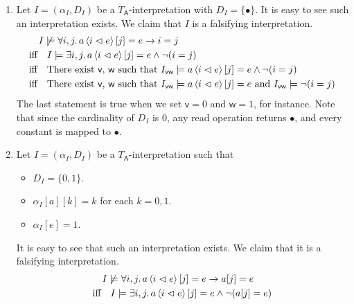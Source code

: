 \begin{exer}[3.4]
    $ $
    \begin{enumerate}[label=(\alph*)]
        \item
            Let $I = (\alpha_I, D_I)$ be a $T_{\textsf{A}}$-interpretation with $D_I = \{ \bullet \}$.
            It is easy to see such an interpretation exists.
            We claim that $I$ is a falsifying interpretation.
            \begin{align*}
                &\quad I \not\models \forall i, j.\, a\ev{i \vartriangleleft e}[j] = e \rightarrow i = j \\
                &\text{iff}\quad I \models \exists i, j.\, a\ev{i \vartriangleleft e}[j] = e \land \neg(i = j) \\
                &\text{iff}\quad \text{There exist \textsf{v}, \textsf{w} such that } I_{\textsf{vw}} \models a\ev{i \vartriangleleft e}[j] = e \land \neg(i = j) \\
                &\text{iff}\quad \text{There exist \textsf{v}, \textsf{w} such that } I_{\textsf{vw}} \models a\ev{i \vartriangleleft e}[j] = e \text{ and } I_{\textsf{vw}} \models \neg(i = j) \\
            \end{align*}
            The last statement is true when we set $\textsf{v} = 0$ and $\textsf{w} = 1$, for instance.
            Note that since the cardinality of $D_I$ is 0, any \textsf{read} operation returns $\bullet$, and every constant is mapped to $\bullet$.
        \item
            Let $I = (\alpha_I, D_I)$ be a $T_{\textsf{A}}$-interpretation such that
            \begin{itemize}
                \item
                    $D_I = \{ 0, 1 \}$.
                \item
                    $\alpha_I[a][k] = k$ for each $k = 0, 1$.
                \item
                    $\alpha_I[e] = 1$.
            \end{itemize}
            It is easy to see that such an interpretation exists.
            We claim that it is a falsifying interpretation.
            \begin{align*}
                &\quad I \not\models \forall i, j.\, a\ev{i \vartriangleleft e}[j] = e \rightarrow a[j] = e \\
                &\text{iff}\quad I \models \exists i, j.\, a\ev{i \vartriangleleft e}[j] = e \land \neg(a[j] = e) \\

\end{align*}
\end{enumerate}
\end{exer}
